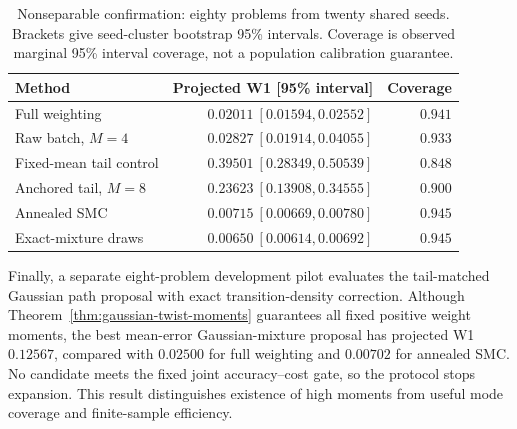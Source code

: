 \begin{table}[t]
\centering\small
\caption{Nonseparable confirmation: eighty problems from twenty shared seeds. Brackets give seed-cluster bootstrap 95\% intervals. Coverage is observed marginal 95\% interval coverage, not a population calibration guarantee.}
\label{tab:sensor-main}
\begin{tabular}{lrr}
\toprule
Method & Projected W1 [95\% interval] & Coverage\\
\midrule
Full weighting & $0.02011\ [0.01594,0.02552]$ & $0.941$\\
Raw batch, $M=4$ & $0.02827\ [0.01914,0.04055]$ & $0.933$\\
Fixed-mean tail control & $0.39501\ [0.28349,0.50539]$ & $0.848$\\
Anchored tail, $M=8$ & $0.23623\ [0.13908,0.34555]$ & $0.900$\\
Annealed SMC & $0.00715\ [0.00669,0.00780]$ & $0.945$\\
Exact-mixture draws & $0.00650\ [0.00614,0.00692]$ & $0.945$\\
\bottomrule
\end{tabular}
\end{table}

Finally, a separate eight-problem development pilot evaluates the tail-matched Gaussian path proposal with exact transition-density correction. Although Theorem~\ref{thm:gaussian-twist-moments} guarantees all fixed positive weight moments, the best mean-error Gaussian-mixture proposal has projected W1 $0.12567$, compared with $0.02500$ for full weighting and $0.00702$ for annealed SMC. No candidate meets the fixed joint accuracy--cost gate, so the protocol stops expansion. This result distinguishes existence of high moments from useful mode coverage and finite-sample efficiency.
